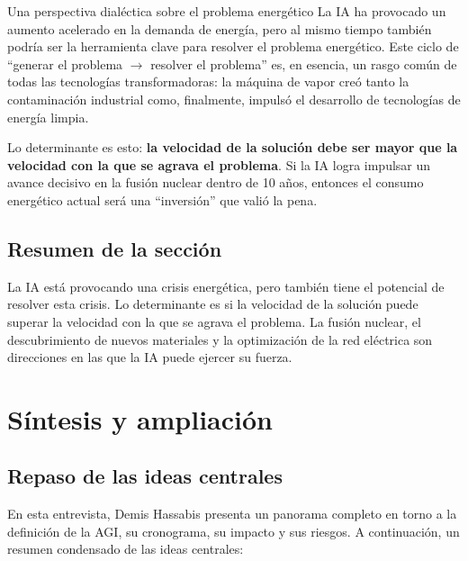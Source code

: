 \documentclass[a4paper]{article}
\begin{document}
\begin{importantbox}{Una perspectiva dialéctica sobre el problema energético}
La IA ha provocado un aumento acelerado en la demanda de energía, pero al mismo tiempo también podría ser la herramienta clave para resolver el problema energético. Este ciclo de ``generar el problema $\to$ resolver el problema'' es, en esencia, un rasgo común de todas las tecnologías transformadoras: la máquina de vapor creó tanto la contaminación industrial como, finalmente, impulsó el desarrollo de tecnologías de energía limpia.

Lo determinante es esto: \textbf{la velocidad de la solución debe ser mayor que la velocidad con la que se agrava el problema}. Si la IA logra impulsar un avance decisivo en la fusión nuclear dentro de 10 años, entonces el consumo energético actual será una ``inversión'' que valió la pena.
\end{importantbox}

\subsection{Resumen de la sección}

La IA está provocando una crisis energética, pero también tiene el potencial de resolver esta crisis. Lo determinante es si la velocidad de la solución puede superar la velocidad con la que se agrava el problema. La fusión nuclear, el descubrimiento de nuevos materiales y la optimización de la red eléctrica son direcciones en las que la IA puede ejercer su fuerza.

\section{Síntesis y ampliación}

\subsection{Repaso de las ideas centrales}

En esta entrevista, Demis Hassabis presenta un panorama completo en torno a la definición de la AGI, su cronograma, su impacto y sus riesgos. A continuación, un resumen condensado de las ideas centrales:
\end{document}
